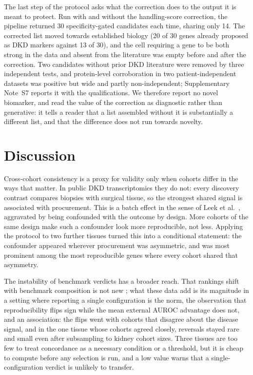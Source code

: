 \documentclass[unnumsec,webpdf,contemporary,large,numbered]{oup-authoring-template}
\begin{document}
The last step of the protocol asks what the correction does to the output it is meant to protect.
Run with and without the handling-score correction, the pipeline returned 30 specificity-gated
candidates each time, sharing only 14. The corrected list moved towards established biology
(20 of 30 genes already proposed as DKD markers against 13 of 30), and the cell requiring a gene
to be both strong in the data and absent from the literature was empty before and after the
correction. Two candidates without prior DKD literature were removed by three independent tests,
and protein-level corroboration in two patient-independent datasets was positive but wide and
partly non-independent; Supplementary Note~S7 reports it with the qualifications. We therefore
report no novel biomarker, and read the value of the correction as diagnostic rather than
generative: it tells a reader that a list assembled without it is substantially a different list,
and that the difference does not run towards novelty.

\section{Discussion}\label{sec:discussion}

Cross-cohort consistency is a proxy for validity only when cohorts differ in the ways that matter.
In public DKD transcriptomics they do not: every discovery contrast compares biopsies with surgical tissue, so
the strongest shared signal is associated with procurement. This is a batch effect in the sense of Leek et al.\
\cite{leek2010}, aggravated by being confounded with the outcome by design. More cohorts of the
same design make such a confounder look more reproducible, not less. Applying the protocol to two
further tissues turned this into a conditional statement: the confounder appeared wherever
procurement was asymmetric, and was most prominent among the most reproducible genes where every
cohort shared that asymmetry.

The instability of benchmark verdicts has a broader reach. That rankings shift with benchmark
composition is not new \cite{boulesteix2013,jelizarow2010,ullmann2023,weber2019,norel2011}; what
these data add is its magnitude in a setting where reporting a single configuration is the norm,
the observation that reproducibility flips sign while the mean external AUROC advantage does not,
and an association: the flips went with cohorts that disagree about the disease signal, and in the
one tissue whose cohorts agreed closely, reversals stayed rare and small even after subsampling to
kidney cohort sizes. Three tissues are too few to treat concordance as a necessary condition or a
threshold, but it is cheap to compute before any selection is run, and a low value warns that a
single-configuration verdict is unlikely to transfer.
\end{document}
